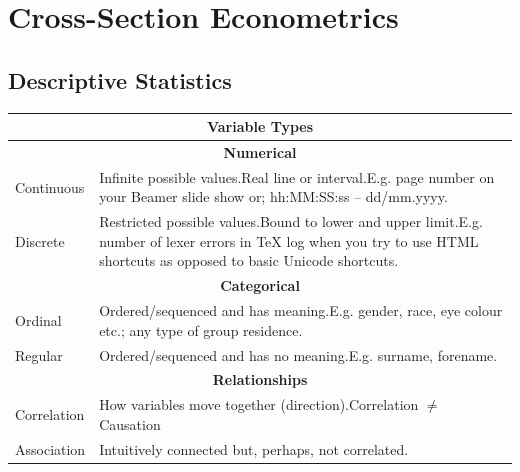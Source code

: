 \documentclass[11pt, english]{article}
\begin{document}
\newpage

\section{Cross-Section Econometrics}

	\subsection{Descriptive Statistics}

	\begin{center}
                \scriptsize
        \begin{longtable}{p{3cm}p{9cm}}
                \hline
                \hline
	       	\multicolumn{2}{c}{\textbf{Variable Types}}\\
                \hline
                \hline
                \multicolumn{2}{c}{\textbf{Numerical}}\\
                \hline
                Continuous & Infinite possible values.\newline Real line or interval.\newline E.g. page number on your Beamer slide show or; hh:MM:SS:ss -- dd/mm.yyyy.\\
                Discrete & Restricted possible values.\newline Bound to lower and upper limit.\newline E.g. number of lexer errors in {\TeX} log when you try to use HTML shortcuts as opposed to basic Unicode shortcuts.\\
                \hline
                \multicolumn{2}{c}{\textbf{Categorical}}\\
                \hline
                Ordinal & Ordered/sequenced and has meaning.\newline E.g. gender, race, eye colour etc.; any type of group residence.\\
                Regular & Ordered/sequenced and has no meaning.\newline E.g. surname, forename.\\
                \hline
                \multicolumn{2}{c}{\textbf{Relationships}}\\
                \hline
                Correlation & How variables move together (direction).\newline Correlation $\neq$ Causation\\
                Association & Intuitively connected but, perhaps, not correlated.\\

\end{longtable}
\end{center}
\end{document}
